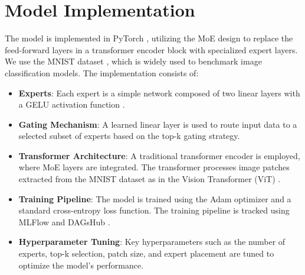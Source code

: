 \documentclass[a4paper,11pt]{article}
\begin{document}
\section{Model Implementation}
The model is implemented in PyTorch \cite{pytorch}, utilizing the MoE design to replace the feed-forward layers in a transformer encoder block with specialized expert layers. We use the MNIST dataset \cite{deng2012mnist}, which is widely used to benchmark image classification models. The implementation consists of:
\begin{itemize}
    \item \textbf{Experts}: Each expert is a simple network composed of two linear layers with a GELU activation function \cite{hendrycks2020gaussian}.
    \item \textbf{Gating Mechanism}: A learned linear layer is used to route input data to a selected subset of experts based on the top-k gating strategy.
    \item \textbf{Transformer Architecture}: A traditional transformer encoder is employed, where MoE layers are integrated. The transformer processes image patches extracted from the MNIST dataset as in the Vision Transformer (ViT) \cite{dosovitskiy2020image}.
    \item \textbf{Training Pipeline}: The model is trained using the Adam optimizer and a standard cross-entropy loss function. The training pipeline is tracked using MLFlow \cite{mlflow} and DAGsHub \cite{dagshub}.
    \item \textbf{Hyperparameter Tuning}: Key hyperparameters such as the number of experts, top-k selection, patch size, and expert placement are tuned to optimize the model's performance.
\end{itemize}


\end{document}
